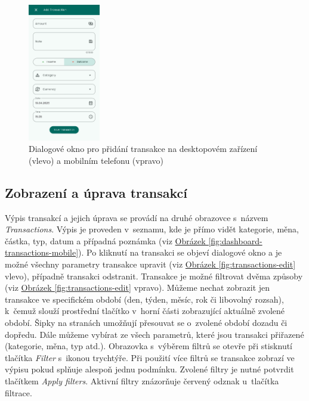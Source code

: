 \documentclass[
  biblatex,
  figures=true,
  tables=false,
  glossaries,
  index
]{kidiplom}
\begin{document}
\begin{figure}
  \centering
  \hspace{0.5em}%
  \includegraphics[width=0.28\textwidth]{images/add-transaction-mobile.png}%
  \caption{Dialogové okno pro přidání transakce na desktopovém zařízení (vlevo) a mobilním telefonu (vpravo)}
  \label{fig:add-transaction}
\end{figure}

\subsection{Zobrazení a úprava transakcí}
Výpis transakcí a jejich úprava se provádí na druhé obrazovce s~názvem \textit{Transactions}. Výpis je proveden v~seznamu, kde je přímo vidět kategorie, měna, částka, typ, datum a případná poznámka (viz \hyperref[fig:dashboard-transactions-mobile]{Obrázek \ref{fig:dashboard-transactions-mobile}}). Po kliknutí na transakci se objeví dialogové okno a je možné všechny parametry transakce upravit (viz \hyperref[fig:transactions-edit]{Obrázek \ref{fig:transactions-edit}} vlevo), případně transakci odstranit. Transakce je možné filtrovat dvěma způsoby (viz \hyperref[fig:transactions-edit]{Obrázek \ref{fig:transactions-edit}} vpravo). Můžeme nechat zobrazit jen transakce ve specifickém období (den, týden, měsíc, rok či libovolný rozsah), k~čemuž slouží prostřední tlačítko v~horní části zobrazující aktuálně zvolené období. Šipky na stranách umožňují přesouvat se o~zvolené období dozadu či dopředu. Dále můžeme vybírat ze všech parametrů, které jsou transakci přiřazené (kategorie, měna, typ atd.). Obrazovka s~výběrem filtrů se otevře při stisknutí tlačítka \textit{Filter} s~ikonou trychtýře. Při použití více filtrů se transakce zobrazí ve výpisu pokud splňuje alespoň jednu podmínku. Zvolené filtry je nutné potvrdit tlačítkem \textit{Apply filters}. Aktivní filtry znázorňuje červený odznak u~tlačítka filtrace.
\end{document}

